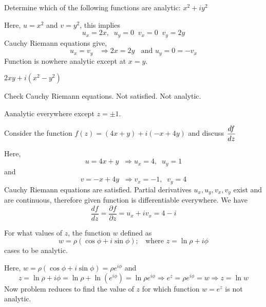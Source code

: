 \begin{problems}
\prob Determine which of the following functions are analytic: 
        \subprob  $x^2+iy^2$ 
        \begin{sol}
        Here, $u=x^2$ and $v=y^2$, this implies 
        \[u_x=2x,\;\;u_y=0\;\;v_x= 0\;\;v_y=2y\]
        Cauchy Riemann equations give,
        \[u_x=v_y \;\;\; \Rightarrow 2x=2y \;\;\text{ and } u_y=0=-v_x\]
        Function is nowhere analytic except at $x=y$.
        \end{sol}       
        \subprob $2xy+i(x^2-y^2)$
        \begin{sol}
        Check Cauchy Riemann equations. Not satisfied. Not analytic.
                \end{sol}       
                
         \begin{sol}Aanalytic everywhere except $z=\pm 1$.\end{sol}

\prob Consider the function $f(z)=(4x+y)+i(-x+4y)$ and discuss $\displaystyle \frac{df}{dz}$ 
\begin{sol}
Here, \[u=4x + y \;\; \Rightarrow u_x=4,\;\;u_y=1\]
and
\[v=-x + 4y \;\; \Rightarrow v_x=-1,\;\;v_y=4\]
Cauchy Riemann equations are satisfied. Partial derivatives $u_x,u_y,v_x,v_y$ exist and are continuous, therefore given function is differentiable everywhere. We have
\[\frac{df}{dz} = \frac{\partial f}{ \partial z} = u_x+iv_x = 4-i\]
\end{sol}
\prob For what values of $z$, the function $w$ defined as
\[w=\rho(\cos \phi + i\sin \phi);\;\;\text{ where } z=\ln \rho + i \phi\]
cases to be analytic.
\begin{sol}
Here, $w=\rho(\cos \phi + i\sin \phi) = \rho e^{i\phi}$ and 
\[z=\ln \rho + i\phi = \ln \rho + \ln (e^{i\phi}) = \ln \rho e^{i\phi}  \Rightarrow e^z = \rho e^{i\phi} = w \Rightarrow z = \ln w \]
Now problem reduces to find the value of $z$ for which function $w=e^z$ is not analytic.


\end{sol}
\end{problems}
